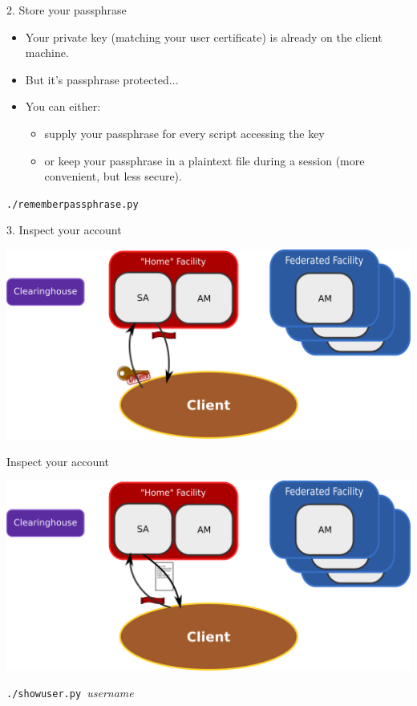 \documentclass[landscape]{slides}
\newcommand{\heading}[1]{{\fontseries{b}\selectfont\begin{center}{\LARGE\color{red} #1}\end{center}}}
\newcommand{\code}[1]{\begin{center}{\tt #1}\end{center}}
\begin{document}
\begin{slide}
\heading{2. Store your passphrase}
\begin{itemize}
\item Your private key (matching your user certificate) is already
  on the client machine.
\item But it's passphrase protected...
\item You can either:
\begin{itemize}
 \item supply your passphrase for every script accessing the key
 \item or keep your passphrase in a plaintext file during a session (more
   convenient, but less secure).
\end{itemize}
\end{itemize}
\code{./rememberpassphrase.py}
\end{slide}

\begin{slide}
\heading{3. Inspect your account}
\begin{center}
\includegraphics[width=15cm]{tutorial-diagram-1}
\end{center}
\end{slide}

\begin{slide}
\heading{Inspect your account}
\begin{center}
\includegraphics[width=15cm]{tutorial-diagram-7}
\end{center}
\begin{center}{\tt ./showuser.py }\emph{username}\end{center}
\end{slide}
\end{document}
